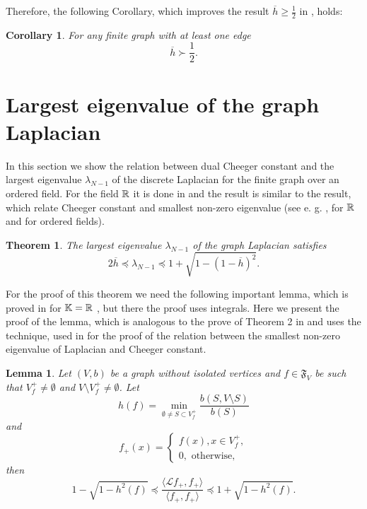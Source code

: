 \documentclass[a4paper,12pt]{amsart}
\newtheorem{theorem}{Theorem}
\newtheorem{lemma}{Lemma}
\newtheorem{corollary}{Corollary}
\theoremstyle{definition}
\renewcommand{\L}{\mathcal{L}}
\newcommand{\F}{\mathfrak{F}}
\begin{document}
Therefore, the following Corollary, which improves the result $\overline h\ge\frac{1}{2}$ in \cite{BauerJost}, holds:
\begin{corollary}
For any finite graph with at least one edge
$$
\overline h \succ \dfrac{1}{2}.
$$
\end{corollary}


\section{Largest eigenvalue of the graph Laplacian}
In this section we show the relation between dual Cheeger constant and the largest eigenvalue $\lambda_{N-1}$ of the discrete Laplacian for the finite graph over an ordered field. For the field $\Bbb R$ it is done in \cite{BauerJost} and the result is similar to the result, which relate Cheeger constant and smallest non-zero eigenvalue (see e. g. \cite{Chung}, \cite{Grigoryan} for $\Bbb R$ and \cite{MuranovaPreprint22} for ordered fields).

\begin{theorem}\label{thmlambda}
The largest eigenvalue $\lambda_{N-1}$ of the graph Laplacian satisfies
$$
2 \overline h\preceq \lambda_{N-1} \preceq 1+\sqrt{1-(1-\overline h)^2}.
$$
\end{theorem}

For the proof of this theorem we need the following important lemma, which is proved in \cite{BauerJost} for $\Bbb K=\Bbb R$ , but there the proof uses integrals.
Here we present the proof of the lemma, which is analogous to the prove of Theorem 2 in \cite{MuranovaPreprint22} and uses the technique, used in \cite{Chung} for the proof of the relation between the smallest non-zero eigenvalue of Laplacian and Cheeger constant.

\begin{lemma}
Let $(V,b)$ be a graph without isolated vertices and $f\in \F_V$ be such that $V^+_f\ne\emptyset$ and $V\setminus V^+_f\ne\emptyset$. Let
\begin{equation*}
h(f)=\min_{\emptyset\ne S\subset V^+_f}\dfrac{b(S, V\setminus S)}{b(S)}
\end{equation*}
and 
$$
f_+(x)=\begin{cases}
f(x), x\in V^+_f,\\
0, \mbox{ otherwise},
\end{cases}
$$
then
\begin{equation*}
1-\sqrt{1-h^2(f)}\preceq \dfrac{\langle\L f_+, f_+\rangle}{\langle f_+, f_+\rangle} \preceq 1+\sqrt{1-h^2(f)}.
\end{equation*}


\end{lemma}
\end{document}
